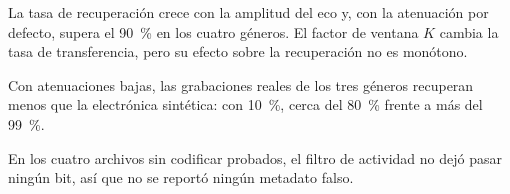 La tasa de recuperación crece con la amplitud del eco y, con la atenuación por defecto, supera el \SI{90}{\percent} en los cuatro géneros. El factor de ventana $K$ cambia la tasa de transferencia, pero su efecto sobre la recuperación no es monótono.

Con atenuaciones bajas, las grabaciones reales de los tres géneros recuperan menos que la electrónica sintética: con \SI{10}{\percent}, cerca del \SI{80}{\percent} frente a más del \SI{99}{\percent}.

En los cuatro archivos sin codificar probados, el filtro de actividad no dejó pasar ningún bit, así que no se reportó ningún metadato falso.
